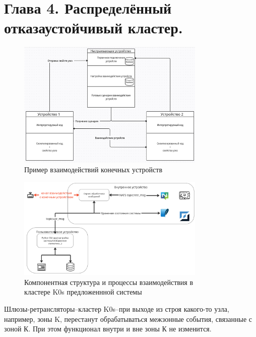 \documentclass[14pt, a4paper]{extreport}
\begin{document}
\chapter{Глава 4. Распределённый отказаустойчивый кластер.}


\begin{figure}[ht]
    \centering
    \includegraphics[width=0.8\textwidth]{images/Fig09.png}
    \caption{Пример взаимодействий конечных устройств}
    \label{fig:Connect_end_device_example}
\end{figure}


\begin{figure}[ht]
    \centering
    \includegraphics[width=0.8\textwidth]{images/InternalSystemDesign.png}
    \captionsetup{justification=centering}
    \caption{Компонентная структура и процессы взаимодействия в\\кластере K0s предложеннной системы}
    \label{fig:InternalSystemDesign}
\end{figure}


Шлюзы-ретрансляторы--кластер K0s--при выходе из строя какого-то узла, например, зоны
K, перестанут обрабатываться межзонные события, связанные с зоной К. При этом функционал внутри и вне зоны
К не изменится.
\end{document}
